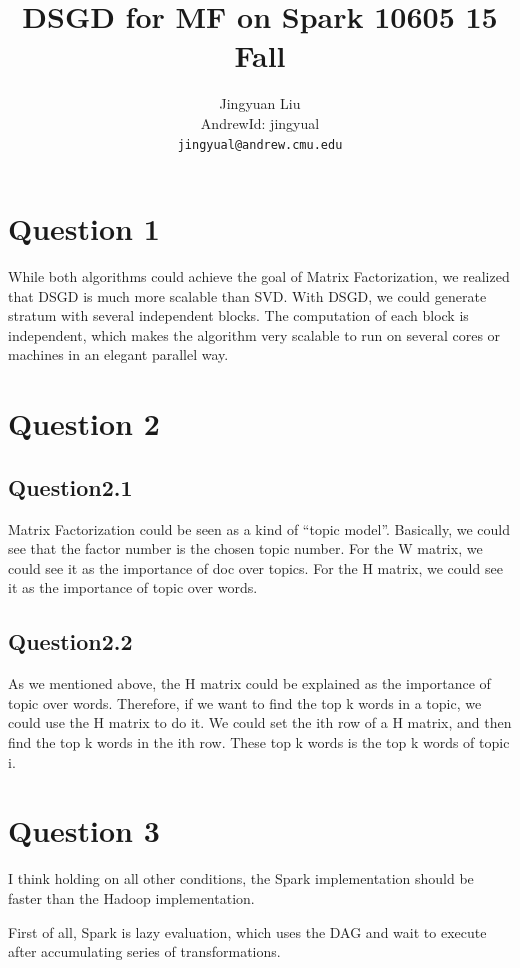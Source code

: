 \documentclass{article} %
\title{DSGD for MF on Spark 10605 15 Fall}
\author{
Jingyuan Liu\\
AndrewId: jingyual\\
\texttt{jingyual@andrew.cmu.edu} \\
}
\begin{document}
\maketitle



\section{Question 1}


While both algorithms could achieve the goal of Matrix Factorization, we
realized that DSGD is much more scalable than SVD. With DSGD, we could generate
stratum with several independent blocks. The computation of each block is
independent, which makes the algorithm very scalable to run on several cores or
machines in an elegant parallel way.



\section{Question 2}


\subsection{Question2.1}
Matrix Factorization could be seen as a kind of ``topic model''. Basically, we
could see that the factor number is the chosen topic number. For the W matrix,
we could see it as the importance of doc over topics. For the H matrix, we could
see it as the importance of topic over words.


\subsection{Question2.2}
As we mentioned above, the H matrix could be explained as the importance of
topic over words. Therefore, if we want to find the top k words in a topic, we
could use the H matrix to do it. We could set the ith row of a H matrix, and then find
the top k words in the ith row. These top k words is the top k words of topic i.



\section{Question 3}
I think holding on all other conditions, the Spark implementation should be
faster than the Hadoop implementation.

First of all, Spark is lazy evaluation, which uses the DAG and wait to execute
after accumulating series of transformations.
\end{document}
